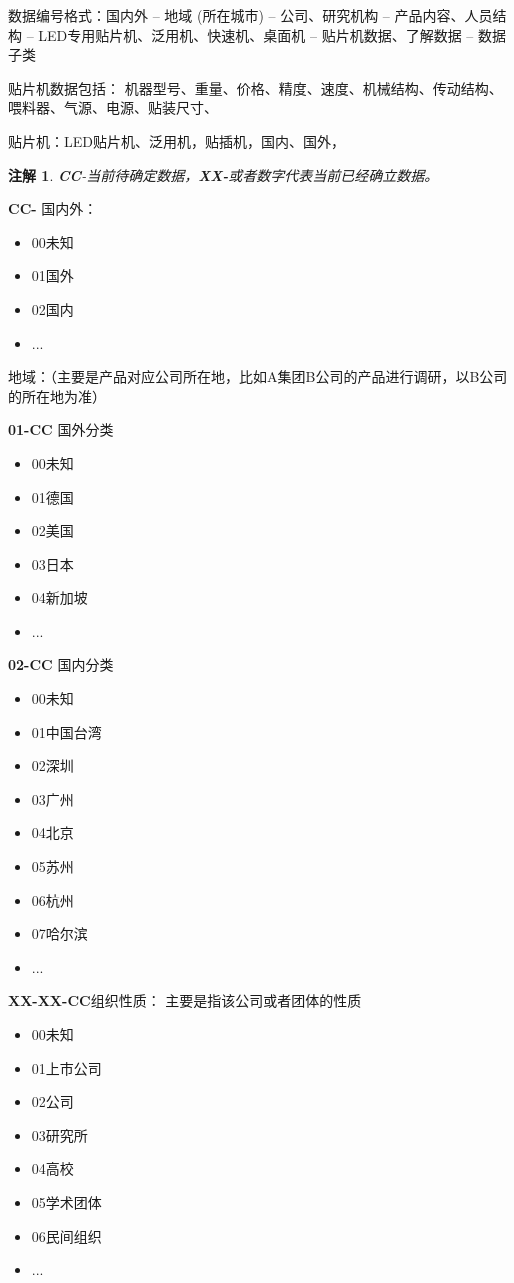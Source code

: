 \documentclass[a4paper,12pt]{article}
\newtheorem{remark}{注解}
\begin{document}
数据编号格式：国内外 -- 地域 (所在城市) -- 公司、研究机构 -- 产品内容、人员结构 -- LED专用贴片机、泛用机、快速机、桌面机 -- 贴片机数据、了解数据 -- 数据子类

贴片机数据包括：
机器型号、重量、价格、精度、速度、机械结构、传动结构、喂料器、气源、电源、贴装尺寸、

贴片机：LED贴片机、泛用机，贴插机，国内、国外，

\begin{remark}
\textbf{CC}-当前待确定数据，\textbf{XX-}或者数字代表当前已经确立数据。
\end{remark}

\textbf{{CC-}} 国内外：
\begin{itemize}
  \item 00未知%
  \item 01国外%
  \item 02国内%
  \item ...
\end{itemize}

地域：（主要是产品对应公司所在地，比如A集团B公司的产品进行调研，以B公司的所在地为准）

\textbf{01-CC} 国外分类
\begin{itemize}
  \item 00未知%
  \item 01德国%
  \item 02美国%
  \item 03日本%
  \item 04新加坡
  \item ...
\end{itemize}

\textbf{02-CC} 国内分类
\begin{itemize}
  \item 00未知%
  \item 01中国台湾
  \item 02深圳
  \item 03广州
  \item 04北京
  \item 05苏州
  \item 06杭州
  \item 07哈尔滨
  \item ...
\end{itemize}


\textbf{XX-XX-CC}组织性质： 主要是指该公司或者团体的性质
\begin{itemize}
  \item 00未知%
  \item 01上市公司
  \item 02公司
  \item 03研究所
  \item 04高校
  \item 05学术团体
  \item 06民间组织
  \item ...
\end{itemize}
\end{document}
